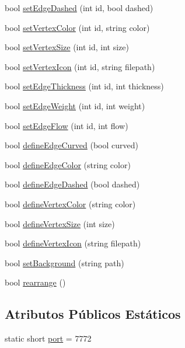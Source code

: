 \begin{DoxyCompactItemize}
\item 
bool \hyperlink{class_graph_viewer_a1698f1c6b3a8e7cabc7b7d7cf42fc7f0}{set\+Edge\+Dashed} (int id, bool dashed)
\item 
bool \hyperlink{class_graph_viewer_a8b542d7e09e81a45a74760c19233beb0}{set\+Vertex\+Color} (int id, string color)
\item 
bool \hyperlink{class_graph_viewer_ae930dfdfcdeb7a871eefb6028d74b9f9}{set\+Vertex\+Size} (int id, int size)
\item 
bool \hyperlink{class_graph_viewer_a02d5f7393eab9a2d1b66719039597a64}{set\+Vertex\+Icon} (int id, string filepath)
\item 
bool \hyperlink{class_graph_viewer_a07f598272fe3515455eab13be749604a}{set\+Edge\+Thickness} (int id, int thickness)
\item 
bool \hyperlink{class_graph_viewer_ac211de009a0afe2e6d44f4f8d030a2cc}{set\+Edge\+Weight} (int id, int weight)
\item 
bool \hyperlink{class_graph_viewer_a69eb065145063e4dea41961e92e35c8e}{set\+Edge\+Flow} (int id, int flow)
\item 
bool \hyperlink{class_graph_viewer_a08f362be0e682d91e7506dca8caae1b8}{define\+Edge\+Curved} (bool curved)
\item 
bool \hyperlink{class_graph_viewer_a4102580b69826ba83251ef7bb262f8be}{define\+Edge\+Color} (string color)
\item 
bool \hyperlink{class_graph_viewer_af785279b5c204df0e274b20c36276fc3}{define\+Edge\+Dashed} (bool dashed)
\item 
bool \hyperlink{class_graph_viewer_a76de8676b7a93d72af514b84cdaa4d21}{define\+Vertex\+Color} (string color)
\item 
bool \hyperlink{class_graph_viewer_ac4b2a9fec74d38e64088aa79ca4b7d9b}{define\+Vertex\+Size} (int size)
\item 
bool \hyperlink{class_graph_viewer_af1adb6a361457187a820e01dcf0a34b7}{define\+Vertex\+Icon} (string filepath)
\item 
bool \hyperlink{class_graph_viewer_a02437b5fecd8b90de24436068312d593}{set\+Background} (string path)
\item 
bool \hyperlink{class_graph_viewer_a3009a66958686ccb7e78b68e37c3c423}{rearrange} ()
\end{DoxyCompactItemize}
\subsection*{Atributos Públicos Estáticos}
\begin{DoxyCompactItemize}
\item 
static short \hyperlink{class_graph_viewer_a89d0abe75f41feededc49497cc514342}{port} = 7772
\end{DoxyCompactItemize}


